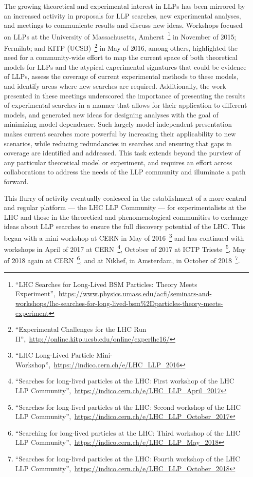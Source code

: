The growing theoretical and experimental interest in LLPs has been mirrored by an increased activity in proposals for LLP searches, new experimental analyses, and meetings to communicate results and discuss new ideas.
Workshops focused on LLPs at the University of Massachusetts, Amherst~\footnote{``LHC Searches for Long-Lived BSM Particles: Theory Meets Experiment'',~\url{https://www.physics.umass.edu/acfi/seminars-and-workshops/lhc-searches-for-long-lived-bsm\%2Dparticles-theory-meets-experiment}} in November of 2015; Fermilab; and KITP (UCSB)~\footnote{``Experimental Challenges for the LHC Run II'',~\url{http://online.kitp.ucsb.edu/online/experlhc16/}} in May of 2016, among others, highlighted the need for a community-wide effort to map the current space of both theoretical models for LLPs and the atypical experimental signatures that could be evidence of LLPs, assess the coverage of current experimental methods to these models, and identify areas where new searches are required.
Additionally, the work presented in these meetings underscored the importance of presenting the results of experimental searches in a manner that allows for their application to different models, and generated new ideas for designing analyses with the goal of minimizing model dependence.
Such largely model-independent presentation makes current searches more powerful by increasing their applicability to new scenarios, while reducing redundancies in searches and ensuring that gaps in coverage are identified and addressed.
This task extends beyond the purview of any particular theoretical model or experiment, and requires an effort across collaborations to address the needs of the LLP community and illuminate a path forward.

This flurry of activity eventually coalesced in the establishment of a more central and regular platform --- the LHC LLP Community --- for experimentalists at the LHC and those in the theoretical and phenomenological communities to exchange ideas about LLP searches to ensure the full discovery potential of the LHC.
This began with a mini-workshop at CERN in May of 2016~\footnote{``LHC Long-Lived Particle Mini-Workshop'',~\url{https://indico.cern.ch/e/LHC_LLP_2016}} and has continued with workshops in April of 2017 at CERN~\footnote{``Searches for long-lived particles at the LHC: First workshop of the LHC LLP Community'',~\url{https://indico.cern.ch/e/LHC_LLP_April_2017}}, October of 2017 at ICTP Trieste~\footnote{``Searches for long-lived particles at the LHC: Second workshop of the LHC LLP Community'',~\url{https://indico.cern.ch/e/LHC_LLP_October_2017}}, May of 2018 again at CERN~\footnote{``Searching for long-lived particles at the LHC: Third workshop of the LHC LLP Community'',~\url{https://indico.cern.ch/e/LHC_LLP_May_2018}}, and at Nikhef, in Amsterdam, in October of 2018~\footnote{``Searches for long-lived particles at the LHC: Fourth workshop of the LHC LLP Community'',~\url{https://indico.cern.ch/e/LHC_LLP_October_2018}}.

